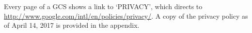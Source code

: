 Every page of a GCS shows a link to `PRIVACY', which directs to \url{http://www.google.com/intl/en/policies/privacy/}. A copy of the privacy policy as of April 14, 2017 is provided in the appendix.